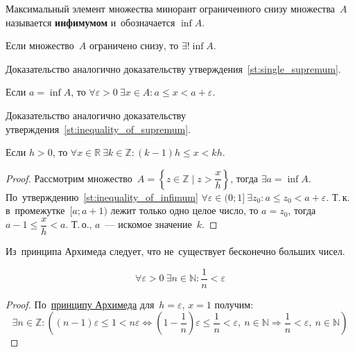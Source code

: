 \hypertarget{def:infimum}{} Максимальный элемент множества минорант ограниченного снизу множества~$A$ называется \textbf{инфимумом} и~обозначается $\inf A$.

\begin{statement}
Если множество~$A$ ограничено снизу, то $\exists! \inf A$.
\end{statement}%
Доказательство аналогично доказательству утверждения~\ref{st:single_supremum}.

\begin{statement}
\label{st:inequality_of_infimum}
Если $a = \inf A$, то $\forall \varepsilon > 0 \ \exists x \in A \colon a \leqslant x < a + \varepsilon$.
\end{statement}%
Доказательство аналогично доказательству утверждения~\ref{st:inequality_of_supremum}.

\hypertarget{th:Archimedes'_principle}{}
\begin{theorem}
Если $h > 0$, то $\forall x \in \mathbb R \ \exists k \in \mathbb Z \colon (k - 1)h \leqslant x < kh$.
\end{theorem}
\begin{proof}
Рассмотрим множество~$A = \left\lbrace z \in \mathbb Z \mid z > \dfrac{x}h \right\rbrace$, тогда $\exists a = \inf A$.
По~утверждению~\ref{st:inequality_of_infimum} $\forall \varepsilon \in (0; 1] \ \exists z_0 \colon a \leqslant z_0 < a + \varepsilon$.
Т.\,к. в~промежутке~$[a; a + 1)$ лежит только одно целое число, то $a = z_0$, тогда $a - 1 \leqslant \dfrac{x}h < a$.
Т.\,о., $a$~--- искомое значение~$k$.
\end{proof}

Из~принципа Архимеда следует, что не~существует бесконечно больших чисел.

\begin{consequent}
\label{conseq:small_rational_exists}
\begin{equation*}
\forall \varepsilon > 0 \ \exists n \in \mathbb N \colon \frac1n < \varepsilon
\end{equation*}
\end{consequent}
\begin{proof}
По~\hyperlink{th:Archimedes'_principle}{принципу Архимеда} для~$h = \varepsilon$, $x = 1$ получим:
\begin{equation*}
\exists n \in \mathbb Z \colon \left( (n - 1)\varepsilon \leqslant 1 < n\varepsilon \Leftrightarrow
(1 - \frac1n)\varepsilon \leqslant \frac1n < \varepsilon, \ n \in \mathbb N \Rightarrow
\frac1n < \varepsilon, \ n \in \mathbb N \right)
\end{equation*}
\end{proof}

